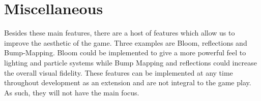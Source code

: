 \section{Miscellaneous}
Besides these main features, there are a host of features which allow us to improve the aesthetic of the game. Three examples are Bloom, reflections and Bump-Mapping. Bloom could be implemented to give a more powerful feel to lighting and particle systems while Bump Mapping and reflections could increase the overall visual fidelity. These features can be implemented at any time throughout development as an extension and are not integral to the game play. As such, they will not have the main focus.

